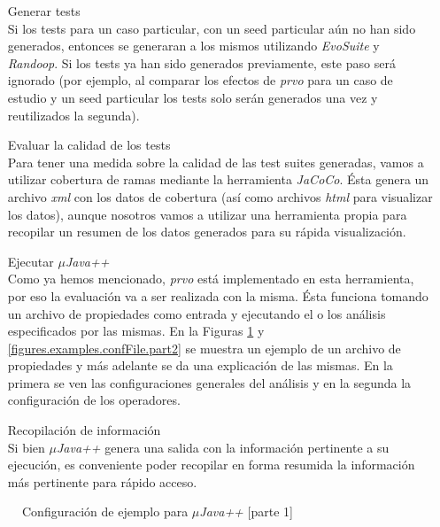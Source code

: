 \begin{enumerate}[leftmargin=.75cm,align=left,style=nextline]
	\item[Generar tests]\mbox{}\\ Si los tests para un caso particular, con un seed particular a\'un no han sido generados, entonces se generaran a los mismos utilizando \emph{EvoSuite} y \emph{Randoop}. Si los tests ya han sido generados previamente, este paso ser\'a ignorado (por ejemplo, al comparar los efectos de \emph{prvo} para un caso de estudio y un seed particular los tests solo ser\'an generados una vez y reutilizados la segunda).
	
	\item[Evaluar la calidad de los tests]\mbox{}\\ Para tener una medida sobre la calidad de las test suites generadas, vamos a utilizar cobertura de ramas mediante la herramienta \emph{JaCoCo}. \'Esta genera un archivo \emph{xml} con los datos de cobertura (as\'i como archivos \emph{html} para visualizar los datos), aunque nosotros vamos a utilizar una herramienta propia para recopilar un resumen de los datos generados para su r\'apida visualizaci\'on.
	
	\item[Ejecutar \emph{$\mu$Java++}]\mbox{}\\ Como ya hemos mencionado, \emph{prvo} est\'a implementado en esta herramienta, por eso la evaluaci\'on va a ser realizada con la misma. \'Esta funciona tomando un archivo de propiedades como entrada y ejecutando el o los an\'alisis especificados por las mismas. En la Figuras \ref{figures.examples.confFile.part1} y \ref{figures.examples.confFile.part2} se muestra un ejemplo de un archivo de propiedades y m\'as adelante se da una explicaci\'on de las mismas. En la primera se ven las configuraciones generales del an\'alisis y en la segunda la configuraci\'on de los operadores.
	
	\item[Recopilaci\'on de informaci\'on]\mbox{}\\ Si bien \emph{$\mu$Java++} genera una salida con la informaci\'on pertinente a su ejecuci\'on, es conveniente poder recopilar en forma resumida la informaci\'on m\'as pertinente para r\'apido acceso.
\end{enumerate}

\begin{figure}
	
	\caption{Configuraci\'on de ejemplo para \emph{$\mu$Java++} [parte 1]}
	\label{figures.examples.confFile.part1}
\end{figure}

